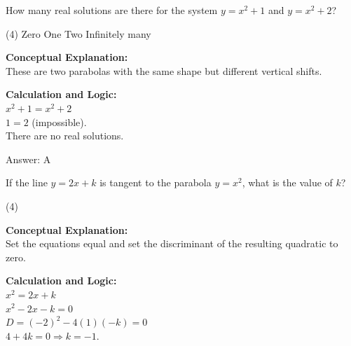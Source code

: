 \documentclass[11pt,paper=a4,answers]{exam}
\begin{document}
\begin{questions}
\vspace{40pt}

\question
How many real solutions are there for the system $y = x^2 + 1$ and $y = x^2 + 2$?
\begin{tasks}(4)
    \task Zero
    \task One
    \task Two
    \task Infinitely many
\end{tasks}

\begin{solution}
\textbf{Conceptual Explanation:} \\
These are two parabolas with the same shape but different vertical shifts.

\vspace{20pt}

\textbf{Calculation and Logic:} \\
$x^2 + 1 = x^2 + 2$ \\
$1 = 2$ (impossible). \\
There are no real solutions.

\vspace{25pt}

Answer: \colorbox{yellow!100}{A}
\end{solution}

\vspace{40pt}

\question
If the line $y = 2x + k$ is tangent to the parabola $y = x^2$, what is the value of $k$?
\begin{tasks}(4)
\end{tasks}

\begin{solution}
\textbf{Conceptual Explanation:} \\
Set the equations equal and set the discriminant of the resulting quadratic to zero.

\vspace{20pt}

\textbf{Calculation and Logic:} \\
$x^2 = 2x + k$ \\
$x^2 - 2x - k = 0$ \\
$D = (-2)^2 - 4(1)(-k) = 0$ \\
$4 + 4k = 0 \Rightarrow k = -1$.

\vspace{25pt}


\end{solution}
\end{questions}
\end{document}
